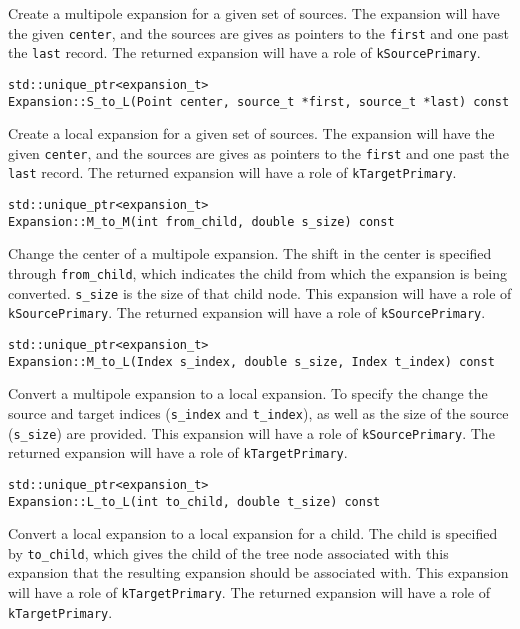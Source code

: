 \noindent Create a multipole expansion for a given set of sources. The
expansion will have the given \texttt{center}, and the sources are gives as
pointers to the \texttt{first} and one past the \texttt{last} record.
The returned expansion will have a role of \texttt{kSourcePrimary}.

\begin{lstlisting}
std::unique_ptr<expansion_t>
Expansion::S_to_L(Point center, source_t *first, source_t *last) const
\end{lstlisting}

\noindent Create a local expansion for a given set of sources. The expansion
will have the given \texttt{center}, and the sources are gives as pointers to
the \texttt{first} and one past the \texttt{last} record.
The returned expansion will have a role of \texttt{kTargetPrimary}.

\begin{lstlisting}
std::unique_ptr<expansion_t>
Expansion::M_to_M(int from_child, double s_size) const
\end{lstlisting}

\noindent Change the center of a multipole expansion. The shift in the center
is specified through \texttt{from\_child}, which indicates the child from which
the expansion is being converted. \texttt{s\_size} is the size of that child
node.
This expansion will have a role of \texttt{kSourcePrimary}.
The returned expansion will have a role of \texttt{kSourcePrimary}.

\begin{lstlisting}
std::unique_ptr<expansion_t>
Expansion::M_to_L(Index s_index, double s_size, Index t_index) const
\end{lstlisting}

\noindent Convert a multipole expansion to a local expansion. To specify the
change the source and target indices (\texttt{s\_index} and \texttt{t\_index}),
as well as the size of the source (\texttt{s\_size}) are provided.
This expansion will have a role of \texttt{kSourcePrimary}.
The returned expansion will have a role of \texttt{kTargetPrimary}.

\begin{lstlisting}
std::unique_ptr<expansion_t>
Expansion::L_to_L(int to_child, double t_size) const
\end{lstlisting}

\noindent Convert a local expansion to a local expansion for a child. The
child is specified by \texttt{to\_child}, which gives the child of the tree
node associated with this expansion that the resulting expansion should be
associated with.
This expansion will have a role of \texttt{kTargetPrimary}.
The returned expansion will have a role of \texttt{kTargetPrimary}.

